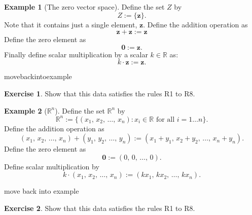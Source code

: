 \documentclass[a4paper,11pt]{book}
\theoremstyle{definition}
\newtheorem{exercise}{Exercise}
\newtheorem{example_environment}{Example}[chapter]
\newcommand{\be}{\begin{equation}}
\newcommand{\ee}{\end{equation}}
\newcommand{\ve}[1]{\mathbf{#1}}
\newenvironment{example}
	{
		\begin{oframed} 
		\begin{example_environment}
	}
	{
		\end{example_environment}
		\end{oframed}
	}
\begin{document}
\begin{example}[The zero vector space] Define the set $Z$ by 
\be
Z := \{ \ve{z} \}.
\ee 
Note that it contains just a single element, $\ve{z}$.  Define the addition operation as 
\be
 \ve{z} + \ve{z} := \ve{z}
\ee
Define the zero element as
\be
 \ve{0} := \ve{z}.
\ee
Finally define scalar multiplication by a scalar $k \in \mathbb{R}$ as:
\be
 k \cdot \ve{z} := \ve{z}.
\ee


\end{example}
movebackintoexample
\begin{exercise} Show that this data satisfies the rules R1 to R8. 
\end{exercise}

\begin{example}[$\mathbb{R}^n$] Define the set $\mathbb{R}^n$ by
\be
 \mathbb{R}^n := \{ (x_1, \, x_2, \, \ldots, \, x_n) : x_i \in \mathbb{R} \mbox{ for all } i = 1 \ldots n\}.
\ee
Define the addition operation as
\be
(x_1, \, x_2, \, \ldots, \, x_n) + (y_1, \, y_2, \, \ldots, \, y_n) := (x_1 + y_1, \, x_2 + y_2, \, \ldots, \, x_n + y_n).
\ee
Define the zero element as
\be
 \ve{0} := (0, \, 0, \, \ldots, \, 0).
\ee
Define scalar multiplication by
\be
 k \cdot (x_1, \, x_2, \, \ldots, \, x_n) := (k x_1, \, k x_2, \, \ldots, \, k x_n).
\ee

\end{example}
move back into example
\begin{exercise} Show that this data satisfies the rules R1 to R8. 
\end{exercise}
\end{document}
